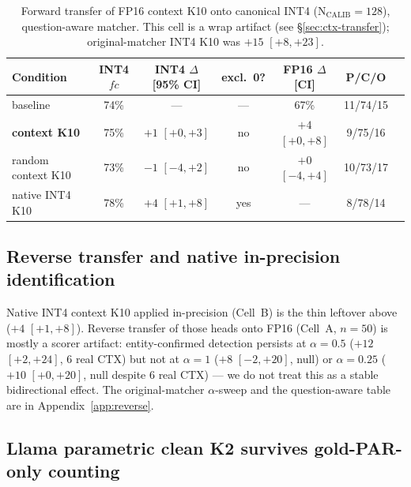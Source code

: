 \documentclass{article} %
\begin{document}
\begin{table}[t]
\caption{Forward transfer of FP16 context K10 onto canonical INT4 ($\mathrm{N_{CALIB}{=}128}$), question-aware matcher. This cell is a wrap artifact (see \S\ref{sec:ctx-transfer}); original-matcher INT4 K10 was $+15$ $[+8,+23]$.}
\label{tab:ctx-k10}
\centering
\footnotesize
\setlength{\tabcolsep}{2.5pt}
\begin{tabular}{lcccccc}
\toprule
Condition & INT4 $fc$ & INT4 $\Delta$ [95\% CI] & excl.\ 0? & FP16 $\Delta$ [CI] & P/C/O \\
\midrule
baseline & 74\% & --- & --- & 67\% & 11/74/15 \\
\textbf{context K10} & 75\% & $+1$ $[+0,+3]$ & no & $+4$ $[+0,+8]$ & 9/75/16 \\
random context K10 & 73\% & $-1$ $[-4,+2]$ & no & $+0$ $[-4,+4]$ & 10/73/17 \\
native INT4 K10 & 78\% & $+4$ $[+1,+8]$ & yes & --- & 8/78/14 \\
\bottomrule
\end{tabular}
\end{table}

\subsection{Reverse transfer and native in-precision identification}
\label{sec:reverse}

Native INT4 context K10 applied in-precision (Cell~B) is the thin leftover above ($+4$ $[+1,+8]$). Reverse transfer of those heads onto FP16 (Cell~A, $n{=}50$) is mostly a scorer artifact: entity-confirmed detection persists at $\alpha{=}0.5$ ($+12$ $[+2,+24]$, 6 real CTX) but not at $\alpha{=}1$ ($+8$ $[-2,+20]$, null) or $\alpha{=}0.25$ ($+10$ $[+0,+20]$, null despite 6 real CTX) --- we do not treat this as a stable bidirectional effect. The original-matcher $\alpha$-sweep and the question-aware table are in Appendix~\ref{app:reverse}.

\subsection{Llama parametric clean K2 survives gold-PAR-only counting}
\label{sec:parametric}
\end{document}
